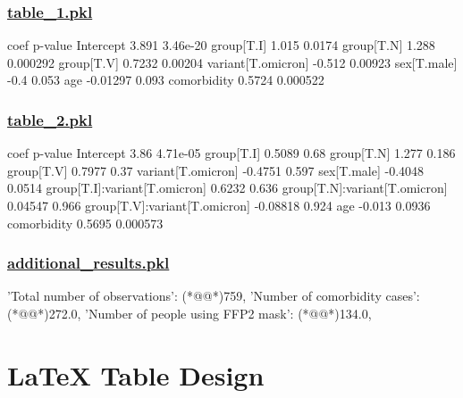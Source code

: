 \documentclass[11pt]{article}
\begin{document}
\subsubsection*{\hyperlink{code-Data Analysis-table-1-pkl}{table\_1.pkl}}

\begin{codeoutput}
                       coef   p-value
Intercept             3.891  3.46e-20
group[T.I]            1.015    0.0174
group[T.N]            1.288  0.000292
group[T.V]           0.7232   0.00204
variant[T.omicron]   -0.512   0.00923
sex[T.male]            -0.4     0.053
age                -0.01297     0.093
comorbidity          0.5724  0.000522
\end{codeoutput}\hypertarget{file-table-2-pkl}{}

\subsubsection*{\hyperlink{code-Data Analysis-table-2-pkl}{table\_2.pkl}}

\begin{codeoutput}
                                  coef   p-value
Intercept                         3.86  4.71e-05
group[T.I]                      0.5089      0.68
group[T.N]                       1.277     0.186
group[T.V]                      0.7977      0.37
variant[T.omicron]             -0.4751     0.597
sex[T.male]                    -0.4048    0.0514
group[T.I]:variant[T.omicron]   0.6232     0.636
group[T.N]:variant[T.omicron]  0.04547     0.966
group[T.V]:variant[T.omicron] -0.08818     0.924
age                             -0.013    0.0936
comorbidity                     0.5695  0.000573
\end{codeoutput}\hypertarget{file-additional-results-pkl}{}

\subsubsection*{\hyperlink{code-Data Analysis-additional-results-pkl}{additional\_results.pkl}}

\begin{codeoutput}
{
    'Total number of observations': (*@@*)759,
    'Number of comorbidity cases': (*@@*)272.0,
    'Number of people using FFP2 mask': (*@@*)134.0,
}
\end{codeoutput}

\section{LaTeX Table Design}
\end{document}
